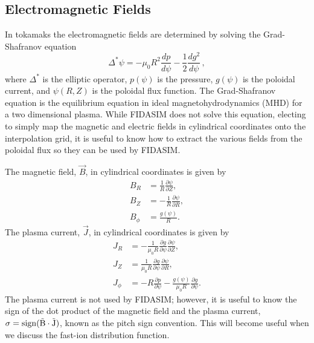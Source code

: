 \subsection{Electromagnetic Fields}
In tokamaks the electromagnetic fields are determined by solving the Grad-Shafranov equation
\begin{equation}\label{eq:grad_shafranov}
    \Delta^* \psi = - \mu_0 R^2 \frac{dp}{d\psi} - \frac{1}{2}\frac{dg^2}{d\psi}\,,
\end{equation}
where $\Delta^*$ is the elliptic operator, $p(\psi)$ is the pressure, $g(\psi)$ is the poloidal current, and $\psi(R,Z)$ is the poloidal flux function.
The Grad-Shafranov equation is the equilibrium equation in ideal magnetohydrodynamics (MHD) for a two dimensional plasma. While FIDASIM does not solve this equation, electing to simply map the magnetic and electric fields in cylindrical coordinates onto the interpolation grid, it is useful to know how to extract the various fields from the poloidal flux so they can be used by FIDASIM.

The magnetic field, $\vec{B}$, in cylindrical coordinates is given by
\begin{equation}\label{eq:bfield}
\begin{split}
    B_R &=  \frac{1}{R}\frac{\partial \psi}{\partial Z}, \\
    B_Z &= -\frac{1}{R}\frac{\partial \psi}{\partial R}, \\
    B_{\phi} &= \frac{g(\psi)}{R}.
\end{split}
\end{equation}
The plasma current, $\vec{J}$, in cylindrical coordinates is given by
\begin{equation}\label{eq:jfield}
\begin{split}
    J_R &= -\frac{1}{\mu_0 R}\frac{\partial g}{\partial \psi} \frac{\partial \psi}{\partial Z}, \\
    J_Z &= \frac{1}{\mu_0 R}\frac{\partial g}{\partial \psi} \frac{\partial \psi}{\partial R}, \\
    J_{\phi} &= -R \frac{\partial p}{\partial \psi} - \frac{g(\psi)}{\mu_0 R}\frac{\partial g}{\partial \psi}.
\end{split}
\end{equation}
The plasma current is not used by FIDASIM; however, it is useful to know the sign of the dot product of the magnetic field and the plasma current, $\sigma = \rm{sign}(\vec{B}\cdot\vec{J})$, known as the pitch sign convention. This will become useful when we discuss the fast-ion distribution function.

